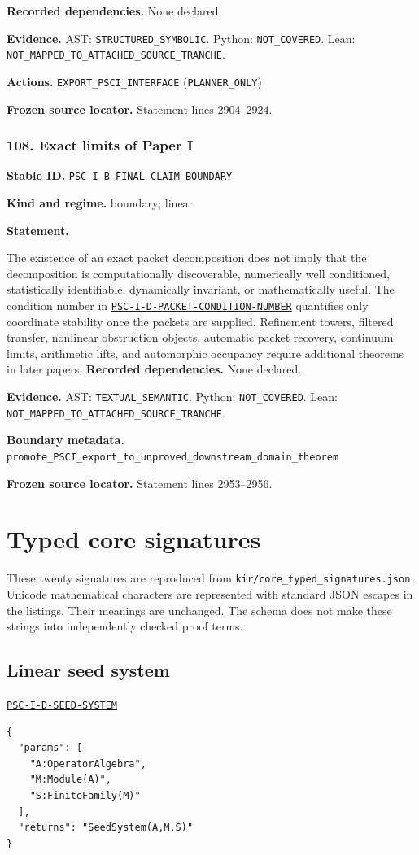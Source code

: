 \documentclass[a4paper,11pt]{article}
\newcommand{\field}[2]{\noindent\textbf{#1.} #2\par}
\begin{document}
\field{Recorded dependencies}{None declared.}
\field{Evidence}{AST: \nolinkurl{STRUCTURED_SYMBOLIC}. Python: \nolinkurl{NOT_COVERED}. Lean: \nolinkurl{NOT_MAPPED_TO_ATTACHED_SOURCE_TRANCHE}.}
\field{Actions}{\nolinkurl{EXPORT_PSCI_INTERFACE} (\nolinkurl{PLANNER_ONLY})}
\field{Frozen source locator}{Statement lines 2904--2924.}
\subsubsection*{108. Exact limits of Paper I}
\label{rec:PSC-I-B-FINAL-CLAIM-BOUNDARY}
\field{Stable ID}{\nolinkurl{PSC-I-B-FINAL-CLAIM-BOUNDARY}}
\field{Kind and regime}{boundary; linear}
\textbf{Statement.}\par
The existence of an exact packet decomposition does not imply that the decomposition is computationally discoverable, numerically well conditioned, statistically identifiable, dynamically invariant, or mathematically useful.  The condition number in \hyperref[rec:PSC-I-D-PACKET-CONDITION-NUMBER]{\nolinkurl{PSC-I-D-PACKET-CONDITION-NUMBER}} quantifies only coordinate stability once the packets are supplied.  Refinement towers, filtered transfer, nonlinear obstruction objects, automatic packet recovery, continuum limits, arithmetic lifts, and automorphic occupancy require additional theorems in later papers.
\field{Recorded dependencies}{None declared.}
\field{Evidence}{AST: \nolinkurl{TEXTUAL_SEMANTIC}. Python: \nolinkurl{NOT_COVERED}. Lean: \nolinkurl{NOT_MAPPED_TO_ATTACHED_SOURCE_TRANCHE}.}
\field{Boundary metadata}{\nolinkurl{promote_PSCI_export_to_unproved_downstream_domain_theorem}}
\field{Frozen source locator}{Statement lines 2953--2956.}
\clearpage\section{Typed core signatures}
These twenty signatures are reproduced from \nolinkurl{kir/core_typed_signatures.json}. Unicode mathematical characters are represented with standard JSON escapes in the listings. Their meanings are unchanged. The schema does not make these strings into independently checked proof terms.
\subsection*{Linear seed system}
\hyperref[rec:PSC-I-D-SEED-SYSTEM]{\nolinkurl{PSC-I-D-SEED-SYSTEM}}
\begin{lstlisting}
{
  "params": [
    "A:OperatorAlgebra",
    "M:Module(A)",
    "S:FiniteFamily(M)"
  ],
  "returns": "SeedSystem(A,M,S)"
}
\end{lstlisting}
\end{document}
